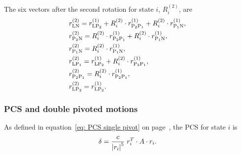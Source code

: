 The six vectors after the second rotation for state $i$, $R_i^{(2)}$, are
\begin{subequations}
\begin{align}
    & r_{\textrm{LN}}^{(2)} = r_{\textrm{LP}_2}^{(1)} + R_i^{(2)} \cdot r_{\textrm{P}_2 \textrm{P}_1}^{(1)} + R_i^{(2)} \cdot r_{\textrm{P}_1 \textrm{N}}^{(1)}, \\
    & r_{\textrm{P}_2 \textrm{N}}^{(2)} = R_i^{(2)} \cdot r_{\textrm{P}_2 \textrm{P}_1}^{(1)} + R_i^{(2)} \cdot r_{\textrm{P}_1 \textrm{N}}^{(1)} , \\
    & r_{\textrm{P}_1 \textrm{N}}^{(2)} = R_i^{(2)} \cdot r_{\textrm{P}_1 \textrm{N}}^{(1)}, \\
    & r_{\textrm{LP}_1}^{(2)} = r_{\textrm{LP}_2}^{(1)} + R_i^{(2)} \cdot r_{\textrm{P}_2 \textrm{P}_1}^{(1)}, \\
    & r_{\textrm{P}_2 \textrm{P}_1}^{(2)} = R_i^{(2)} \cdot r_{\textrm{P}_2 \textrm{P}_1}^{(1)}, \\
    & r_{\textrm{LP}_2}^{(2)} = r_{\textrm{LP}_2}^{(1)} .
\end{align}
\end{subequations}





\subsubsection{PCS and double pivoted motions}

As defined in equation~\ref{eq: PCS single pivot} on page~\pageref{eq: PCS single pivot}, the PCS for state $i$ is
\begin{equation}
    \delta = \frac{c}{\left| r_i \right|^5} \; r_i^T \cdot A \cdot r_i .
\end{equation}


